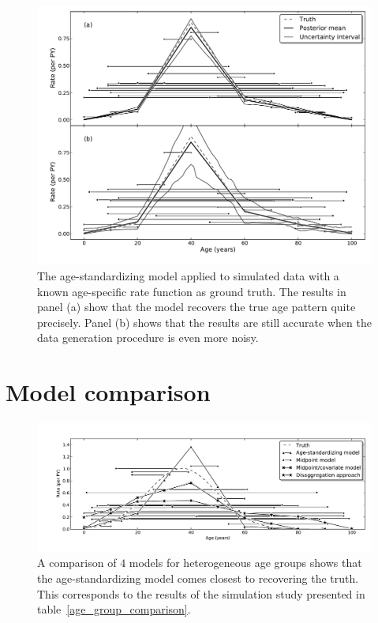 \begin{figure}[h]
\begin{center}
\includegraphics[width=\textwidth]{age_group_standardize.pdf}
\caption[The age-standardizing model applied to simulated data.]{The
  age-standardizing model applied to simulated data with a
  known age-specific rate function as ground truth.  The results in
  panel (a) show that the model
  recovers the true age pattern quite precisely. Panel (b) shows that the
  results are still accurate when the data generation procedure is
  even more noisy.}
\label{age-group-standardize}
\end{center}
\end{figure}


\section{Model comparison}
\label{agm-compare}

\begin{figure}[h]
\begin{center}
\includegraphics[width=\textwidth]{age_group_models.pdf}
\caption[A comparison of $4$ models for heterogeneous age groups.]{A
  comparison of $4$ models for heterogeneous age groups shows that the
  age-standardizing model comes closest to recovering the truth.  This
  corresponds to the results of the simulation study presented in table~\ref{age_group_comparison}.}
\label{age-group-model-comparison}
\end{center}
\end{figure}


